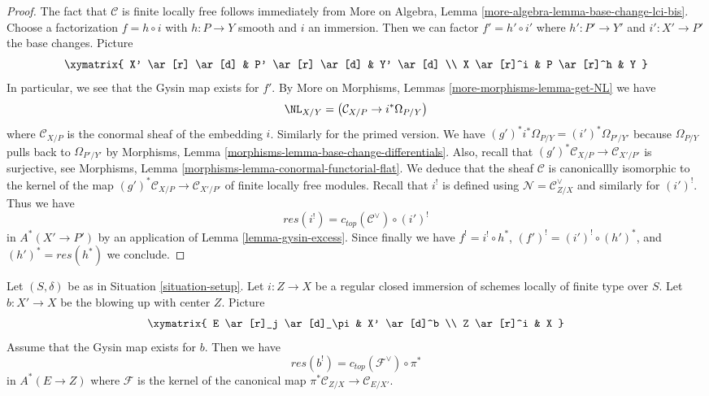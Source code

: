 \begin{proof}
The fact that $\mathcal{C}$ is finite locally free follows immediately
from More on Algebra, Lemma \ref{more-algebra-lemma-base-change-lci-bis}.
Choose a factorization $f = h \circ i$ with $h : P \to Y$ smooth and $i$
an immersion. Then we can factor $f' = h' \circ i'$ where $h' : P' \to Y'$
and $i' : X' \to P'$ the base changes. Picture
$$
\xymatrix{
X' \ar[r] \ar[d] &
P' \ar[r] \ar[d] &
Y' \ar[d] \\
X \ar[r]^i &
P \ar[r]^h &
Y
}
$$
In particular, we see that the Gysin map exists for $f'$. By
More on Morphisms, Lemmas \ref{more-morphisms-lemma-get-NL}
we have
$$
\NL_{X/Y} = \left( \mathcal{C}_{X/P} \to i^*\Omega_{P/Y} \right)
$$
where $\mathcal{C}_{X/P}$ is the conormal sheaf of the embedding $i$.
Similarly for the primed version. We have
$(g')^*i^*\Omega_{P/Y} = (i')^*\Omega_{P'/Y'}$ because
$\Omega_{P/Y}$ pulls back to $\Omega_{P'/Y'}$ by
Morphisms, Lemma \ref{morphisms-lemma-base-change-differentials}.
Also, recall that $(g')^*\mathcal{C}_{X/P} \to \mathcal{C}_{X'/P'}$
is surjective, see
Morphisms, Lemma \ref{morphisms-lemma-conormal-functorial-flat}.
We deduce that the sheaf $\mathcal{C}$ is canonicallly
isomorphic to the kernel of the map
$(g')^*\mathcal{C}_{X/P} \to \mathcal{C}_{X'/P'}$
of finite locally free modules. Recall that $i^!$ is defined
using $\mathcal{N} = \mathcal{C}_{Z/X}^\vee$ and similarly
for $(i')^!$. Thus we have
$$
res(i^!) = c_{top}(\mathcal{C}^\vee) \circ (i')^!
$$
in $A^*(X' \to P')$ by an application of Lemma \ref{lemma-gysin-excess}.
Since finally we have $f^! = i^! \circ h^*$,
$(f')^! = (i')^! \circ (h')^*$, and $(h')^* = res(h^*)$ we conclude.
\end{proof}

\begin{lemma}
\label{lemma-blow-up-formula}
Let $(S, \delta)$ be as in Situation \ref{situation-setup}.
Let $i : Z \to X$ be a regular closed immersion of schemes
locally of finite type over $S$. Let $b : X' \to X$ be the
blowing up with center $Z$. Picture
$$
\xymatrix{
E \ar[r]_j \ar[d]_\pi & X' \ar[d]^b \\
Z \ar[r]^i & X
}
$$
Assume that the Gysin map exists for $b$. Then we have
$$
res(b^!) = c_{top}(\mathcal{F}^\vee) \circ \pi^*
$$
in $A^*(E \to Z)$ where $\mathcal{F}$ is the kernel of the canonical map
$\pi^*\mathcal{C}_{Z/X} \to \mathcal{C}_{E/X'}$.
\end{lemma}


